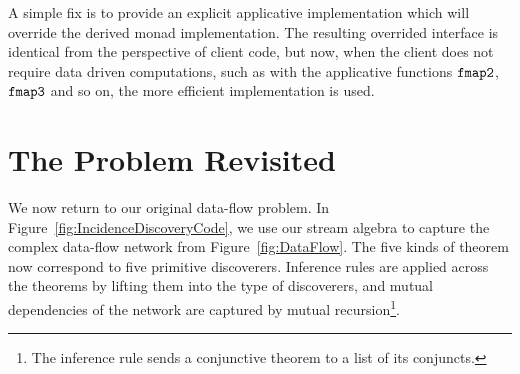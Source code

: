 A simple fix is to provide an explicit applicative implementation which will override the derived monad implementation. The resulting overrided interface is identical from the perspective of client code, but now, when the client does not require data driven computations, such as with the applicative functions $\texttt{fmap2}$, $\texttt{fmap3}$ and so on, the more efficient implementation is used.

\section{The Problem Revisited}\label{sec:Solution}
We now return to our original data-flow problem. In Figure~\ref{fig:IncidenceDiscoveryCode}, we use our stream algebra to capture the complex data-flow network from Figure~\ref{fig:DataFlow}. The five kinds of theorem now correspond to five primitive discoverers. Inference rules are applied across the theorems by lifting them into the type of discoverers, and mutual dependencies of the network are captured by mutual recursion\footnote{The inference rule  sends a conjunctive theorem to a list of its conjuncts.}.
